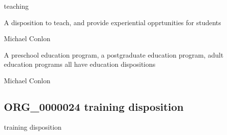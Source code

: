 \documentclass[letterpaper,10pt,english]{sphinxmanual}
\begin{document}
\begin{sphinxShadowBox}

\sphinxAtStartPar
teaching
\end{sphinxShadowBox}

\begin{sphinxShadowBox}

\sphinxAtStartPar
{\hyperref[\detokenize{doc-BFO_0000016::doc}]{}}
\end{sphinxShadowBox}

\begin{sphinxShadowBox}

\sphinxAtStartPar
A disposition to teach, and provide experiential opprtunities for students
\end{sphinxShadowBox}

\begin{sphinxShadowBox}

\sphinxAtStartPar
Michael Conlon 
\end{sphinxShadowBox}

\begin{sphinxShadowBox}

\sphinxAtStartPar
A pre\sphinxhyphen{}school education program, a post\sphinxhyphen{}graduate education program, adult education programs all have education dispositions
\end{sphinxShadowBox}

\begin{sphinxShadowBox}

\sphinxAtStartPar
Michael Conlon 
\end{sphinxShadowBox}
\begin{quote}

\ignorespaces \end{quote}


\subsection{ORG\_0000024 \sphinxhyphen{} training disposition}
\label{\detokenize{doc-ORG_0000024:org-0000024-training-disposition}}\label{\detokenize{doc-ORG_0000024:index-0}}\label{\detokenize{doc-ORG_0000024::doc}}
\begin{sphinxShadowBox}

\sphinxAtStartPar
training disposition
\end{sphinxShadowBox}
\end{document}
